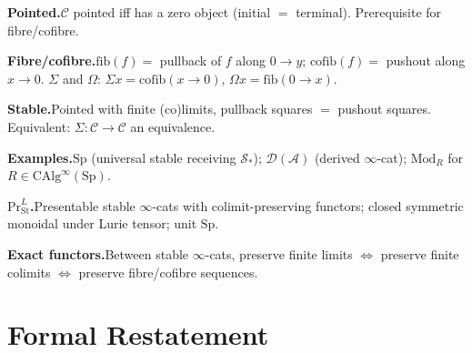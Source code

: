 \begin{summarybox}
\textbf{Pointed.}\quad $\mathcal{C}$ pointed iff has a zero object
(initial $=$ terminal). Prerequisite for fibre/cofibre.

\textbf{Fibre/cofibre.}\quad $\mathrm{fib}(f) = $ pullback of $f$ along
$0 \to y$; $\mathrm{cofib}(f) = $ pushout along $x \to 0$. $\Sigma$ and
$\Omega$: $\Sigma x = \mathrm{cofib}(x \to 0)$, $\Omega x = \mathrm{fib}(0 \to x)$.

\textbf{Stable.}\quad Pointed with finite (co)limits, pullback squares
$=$ pushout squares. Equivalent: $\Sigma : \mathcal{C} \to \mathcal{C}$
an equivalence.

\textbf{Examples.}\quad $\mathrm{Sp}$ (universal stable receiving
$\mathcal{S}_*$); $\mathcal{D}(\mathcal{A})$ (derived $\infty$-cat);
$\mathrm{Mod}_R$ for $R \in \mathrm{CAlg}^\infty(\mathrm{Sp})$.

\textbf{$\mathrm{Pr}^L_{\mathrm{St}}$.}\quad Presentable stable
$\infty$-cats with colimit-preserving functors; closed symmetric
monoidal under Lurie tensor; unit $\mathrm{Sp}$.

\textbf{Exact functors.}\quad Between stable $\infty$-cats, preserve
finite limits $\iff$ preserve finite colimits $\iff$ preserve
fibre/cofibre sequences.
\end{summarybox}


\section*{Formal Restatement}

